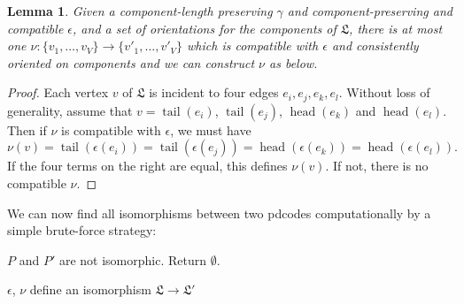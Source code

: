 \documentclass[amsmath,secnumarabic,amssymb,floatfix,nofootinbib,nobibnotes,letterpaper,11pt,tightenlines,showkeys]{revtex4}
\newtheorem{lemma}[theorem]{Lemma}
\theoremstyle{definition}
\newcommand{\head}{\operatorname{head}}
\newcommand{\tail}{\operatorname{tail}}
\begin{document}

\begin{lemma}
Given a component-length preserving $\gamma$ and component-preserving and compatible $\epsilon$, and a set of orientations for the components of $\mathfrak{L}$, there is at most one $\nu : \{v_1, \dots, v_V\} \rightarrow \{v'_1,\dots,v'_V\}$ which is compatible with $\epsilon$ and consistently oriented on components and we can construct $\nu$ as below.
\end{lemma}

\begin{proof}
Each vertex $v$ of $\mathfrak{L}$ is incident to four edges $e_i, e_j, e_k, e_l$. Without loss of generality, assume that $v = \tail(e_i)$, $\tail(e_j)$, $\head(e_k)$ and $\head(e_l)$. Then if $\nu$ is compatible with $\epsilon$, we must have
\begin{equation*}
\nu(v) = \tail(\epsilon(e_i)) = \tail(\epsilon(e_j)) = \head(\epsilon(e_k)) = \head(\epsilon(e_l)).
\end{equation*}
If the four terms on the right are equal, this defines $\nu(v)$. If not, there is no compatible $\nu$.
\end{proof}

We can now find all isomorphisms between two pdcodes computationally by a simple brute-force strategy:

\begin{algorithmic}

	\State $P$ and $P'$ are not isomorphic. Return $\emptyset$.
\EndIf

			\State $\epsilon$, $\nu$ define an isomorphism $\mathfrak{L} \rightarrow \mathfrak{L}'$
		\EndIf
		\EndIf
	\EndFor
\EndFor
\EndProcedure
\end{algorithmic}
\end{document}
